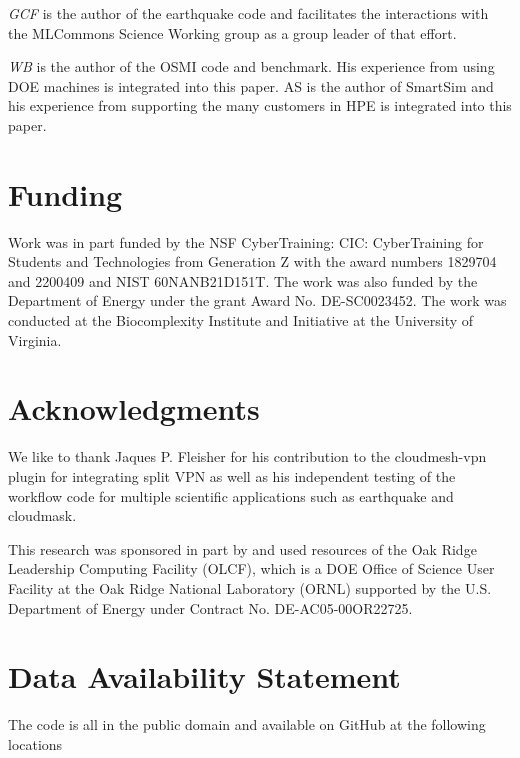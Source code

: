 \documentclass[utf8]{FrontiersinVancouver} %
\begin{document}
{\em GCF} is the author of the earthquake code and facilitates the interactions with the MLCommons Science Working group as a group leader of that effort. 


{\em WB} is the author of the OSMI code and benchmark. His experience from using DOE machines is integrated into this paper. {AS} is the author of SmartSim and his experience from supporting the many customers in HPE is integrated into this paper.

\section*{Funding}

Work was in part funded by the NSF CyberTraining: CIC: CyberTraining for Students and Technologies from Generation Z with the award numbers 1829704 and 2200409 and NIST 60NANB21D151T.  The work was also funded by the Department of Energy under the grant Award No. DE-SC0023452. The work was conducted at the Biocomplexity Institute and Initiative at the University of Virginia.

\section*{Acknowledgments}

We like to thank Jaques P. Fleisher for his contribution to the cloudmesh-vpn plugin for integrating split VPN as well as his independent testing of the workflow code for multiple scientific applications such as earthquake and cloudmask.

This research was sponsored in part by and used resources of the Oak Ridge Leadership Computing Facility (OLCF), which is a DOE Office of Science User Facility at the Oak Ridge National Laboratory (ORNL) supported by the U.S. Department of Energy under Contract No. DE-AC05-00OR22725.

\section*{Data Availability Statement}

The code is all in the public domain and available on GitHub at the following locations
\end{document}
